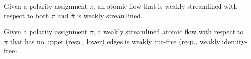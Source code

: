 
\begin{proposition}\label{proposition:FlowWeaklyStreamlinedPolarity}
Given a polarity assignment $\pi$, an atomic flow that is weakly streamlined with respect to both $\pi$ and $\bar\pi$ is weakly streamlined. 
\end{proposition}

\begin{proposition}\label{proposition:FlowWeaklyCutFreePolarity}
Given a polarity assignment $\pi$, a weakly streamlined atomic flow with respect to $\pi$ that has no upper (resp., lower) edges is weakly cut-free (resp., weakly identity-free).
\end{proposition}



